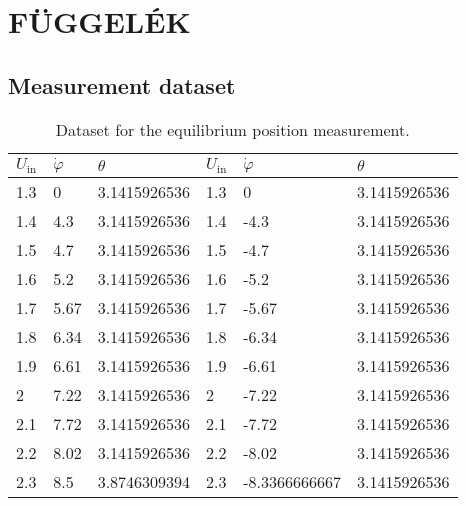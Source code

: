 \part*{FÜGGELÉK}

\chapter{Measurement dataset}


 \begin{table}[h]
	\centering
	\caption{Dataset for the equilibrium position measurement. }
	\label{tab:bif_beas}
	\begin{footnotesize}
	\begin{tabular}{@{}lll|lll@{}}
		\toprule
		$U_\mathrm{in}$ & $\dot{\varphi}$ & $\theta$     & $U_\mathrm{in}$ & $\dot{\varphi}$ & $\theta$     \\ \midrule
		1.3             & 0               & 3.1415926536 & 1.3             & 0               & 3.1415926536 \\
		1.4             & 4.3             & 3.1415926536 & 1.4             & -4.3            & 3.1415926536 \\
		1.5             & 4.7             & 3.1415926536 & 1.5             & -4.7            & 3.1415926536 \\
		1.6             & 5.2             & 3.1415926536 & 1.6             & -5.2            & 3.1415926536 \\
		1.7             & 5.67            & 3.1415926536 & 1.7             & -5.67           & 3.1415926536 \\
		1.8             & 6.34            & 3.1415926536 & 1.8             & -6.34           & 3.1415926536 \\
		1.9             & 6.61            & 3.1415926536 & 1.9             & -6.61           & 3.1415926536 \\
		2               & 7.22            & 3.1415926536 & 2               & -7.22           & 3.1415926536 \\
		2.1             & 7.72            & 3.1415926536 & 2.1             & -7.72           & 3.1415926536 \\
		2.2             & 8.02            & 3.1415926536 & 2.2             & -8.02           & 3.1415926536 \\
		2.3             & 8.5             & 3.8746309394 & 2.3             & -8.3366666667   & 3.1415926536 \\

\end{tabular}
\end{footnotesize}
\end{table}

